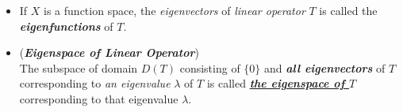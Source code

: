 \documentclass[11pt]{article}
\begin{document}
\begin{itemize}
\item \begin{remark}
If $X$ is a function space, the \emph{eigenvectors} of \emph{linear operator} $T$ is called the \emph{\textbf{eigenfunctions}} of $T$.
\end{remark}

\item \begin{definition} (\emph{\textbf{Eigenspace of Linear Operator}})\\
The subspace of domain $D(T)$ consisting of $\{0\}$ and \emph{\textbf{all eigenvectors}} of $T$ corresponding to \emph{an eigenvalue} $\lambda$ of $T$ is
called  \underline{\textbf{\emph{the eigenspace of $T$}}} corresponding to that eigenvalue $\lambda$.
\end{definition}
\end{itemize}
\end{document}
